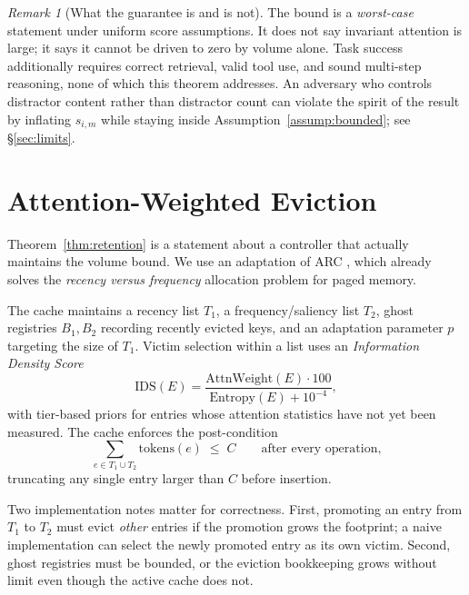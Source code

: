 ﻿\documentclass[11pt,a4paper]{article}
\theoremstyle{plain}
\theoremstyle{definition}
\theoremstyle{remark}
\newtheorem{remark}{Remark}
\begin{document}
\begin{remark}[What the guarantee is and is not]
The bound is a \emph{worst-case} statement under uniform score assumptions. It
does not say invariant attention is large; it says it cannot be driven to zero by
volume alone. Task success additionally requires correct retrieval, valid tool
use, and sound multi-step reasoning, none of which this theorem addresses. An
adversary who controls distractor content rather than distractor count can
violate the spirit of the result by inflating $s_{i,m}$ while staying inside
Assumption~\ref{assump:bounded}; see \S\ref{sec:limits}.
\end{remark}

\section{Attention-Weighted Eviction}
\label{sec:awe}

Theorem~\ref{thm:retention} is a statement about a controller that actually
maintains the volume bound. We use an adaptation of ARC \cite{megiddo2003arc},
which already solves the \emph{recency versus frequency} allocation problem for
paged memory.

The cache maintains a recency list $T_1$, a frequency/saliency list $T_2$, ghost
registries $B_1, B_2$ recording recently evicted keys, and an adaptation
parameter $p$ targeting the size of $T_1$. Victim selection within a list uses an
\emph{Information Density Score}
\begin{equation}
  \mathrm{IDS}(E)
  = \frac{\mathrm{AttnWeight}(E) \cdot 100}{\mathrm{Entropy}(E) + 10^{-4}} ,
  \label{eq:ids}
\end{equation}
with tier-based priors for entries whose attention statistics have not yet been
measured. The cache enforces the post-condition
\begin{equation}
  \sum_{e \in T_1 \cup T_2} \mathrm{tokens}(e) \;\le\; C
  \qquad \text{after every operation,}
\end{equation}
truncating any single entry larger than $C$ before insertion.

Two implementation notes matter for correctness. First, promoting an entry from
$T_1$ to $T_2$ must evict \emph{other} entries if the promotion grows the
footprint; a naive implementation can select the newly promoted entry as its own
victim. Second, ghost registries must be bounded, or the eviction bookkeeping
grows without limit even though the active cache does not.
\end{document}
